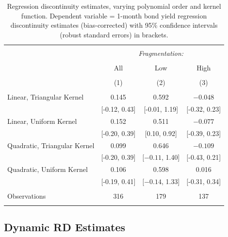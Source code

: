 \documentclass[12pt]{article}
\begin{document}
\begin{appendices}
	\begin{table}[h] \centering 
		\caption{Regression discontinuity estimates, varying polynomial order and kernel function. Dependent variable = 1-month bond yield regression discontinuity estimates (bias-corrected) with 95\% confidence intervals (robust standard errors) in brackets.} 
		\label{table:RDQuadratic} 
		\begin{tabular}{@{\extracolsep{5pt}}lccc} 
			\\[-1.8ex]\hline 
			\hline \\[-1.8ex] 
			& \multicolumn{3}{c}{\textit{Fragmentation:}} \\ 
			\cline{2-4} 
			\\[-1.8ex] & All & Low & High \\ 
			\\[-1.8ex] & (1) & (2) & (3)\\ 
			\hline \\[-1.8ex] 	
			Linear, Triangular Kernel & 0.145 & 0.592 & $-0.048$ \\ 
			& [-0.12, 0.43] & [-0.01, 1.19] & [-0.32, 0.23] \\ 
			Linear, Uniform Kernel & 0.152 & 0.511 & $-0.077$ \\ 
			& [-0.20, 0.39] & [0.10, 0.92] & [-0.39, 0.23] \\ 
			Quadratic, Triangular Kernel & 0.099 & 0.646 & $-0.109$ \\ 
			& [-0.20, 0.39] & [$-0.11$, 1.40] & [-0.43, 0.21] \\ 
			Quadratic, Uniform Kernel & 0.106 & 0.598 & 0.016 \\ 
			& [-0.19, 0.41] & [$-0.14$, 1.33] & [-0.31, 0.34] \\ 
			\hline \\[-1.8ex] 
			Observations & 316 & 179 & 137 \\ 
			\hline 
			\hline \\[-1.8ex] 
		\end{tabular} 
	\end{table}  
	
	\subsection{Dynamic RD Estimates} 


\end{appendices}
\end{document}
